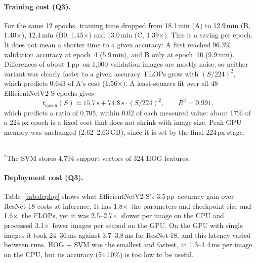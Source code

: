 \documentclass{COMPXXXX}
\newcommand{\pp}{\,pp}
\newcommand{\sx}{$\times$}
\begin{document}
\paragraph{Training cost (Q3).} For the same 12 epochs, training time dropped from 18.1\,min (A) to
12.9\,min (B, 1.40\sx), 12.4\,min (B0, 1.45\sx) and 13.0\,min (C, 1.39\sx). This is a saving per epoch.
It does not mean a shorter time to a given accuracy: A first reached 96.3\% validation accuracy at
epoch~4 (5.9\,min), and B only at epoch~10 (9.9\,min). Differences of about 1\pp\ on 1{,}000 validation
images are mostly noise, so neither variant was clearly faster to a given accuracy. FLOPs grow with
$(S/224)^2$, which predicts 0.643 of A's cost (1.56\sx). A least-squares fit over all 48
EfficientNetV2-S epochs gives
\begin{equation}
t_{\text{epoch}}(S) \approx 15.7\,\text{s} + 74.8\,\text{s}\cdot(S/224)^2,\qquad R^2=0.991,
\label{eq:cost}
\end{equation}
which predicts a ratio of 0.705, within 0.02 of each measured value: about 17\% of a 224\,px epoch is a
fixed cost that does not shrink with image size. Peak GPU memory was unchanged (2.62--2.63\,GB), since
it is set by the final 224\,px stage.

\begin{table}[t]
\centering\footnotesize
\caption{Deployment cost of the final models (224\,px input; all EfficientNetV2-S variants share one
architecture). Ranges span two benchmark runs. CPU: one image, fp32. GPU: RTX~2050, fp16, batches of 32.}
\label{tab:deploy}
\setlength{\tabcolsep}{3pt}
\\[1pt]
{\footnotesize $^\ast$The SVM stores 4{,}794 support vectors of 324 HOG features.}
\end{table}

\paragraph{Deployment cost (Q3).} Table~\ref{tab:deploy} shows what EfficientNetV2-S's 3.5\pp\ accuracy
gain over ResNet-18 costs at inference. It has 1.8\sx\ the parameters and checkpoint size and 1.6\sx\
the FLOPs, yet it was 2.5--2.7\sx\ slower per image on the CPU and processed 3.1\sx\ fewer images per
second on the GPU. On the GPU with single images it took 24--36\,ms against 3.7--3.8\,ms for ResNet-18,
and this latency varied between runs. HOG + SVM was the smallest and fastest, at 1.3--1.4\,ms per image
on the CPU, but its accuracy (54.10\%) is too low to be useful.
\end{document}

